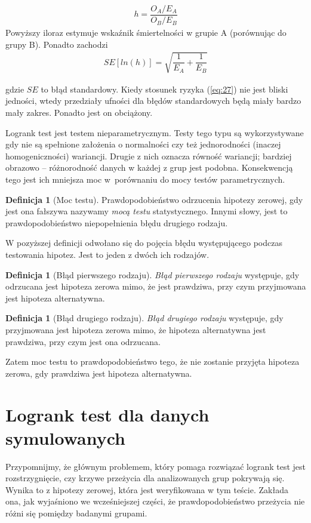 \documentclass[licencjacka]{pwr_wmat_praca_dyplomowa}
\theoremstyle{plain}
\numberwithin{theorem}{chapter}
\theoremstyle{definition}
\numberwithin{theorem}{chapter}
\newtheorem{definition}[theorem]{Definicja}
\begin{document}
\begin{align}
h=\dfrac{O_A/E_A}{O_B/E_B}
\label{eq:27}
\end{align}
Powyższy iloraz estymuje wskaźnik śmiertelności w grupie A (porównując do grupy B). Ponadto zachodzi
\begin{align*}
SE[ln(h)]=\sqrt{\dfrac{1}{E_A}+\dfrac{1}{E_B}}
\end{align*}

\noindent gdzie $SE$ to błąd standardowy. Kiedy stosunek ryzyka (\ref{eq:27}) nie jest bliski jedności, wtedy przedziały ufności dla błędów standardowych będą miały bardzo mały zakres. Ponadto jest on obciążony.

Logrank test jest testem nieparametrycznym. Testy tego typu są wykorzystywane gdy nie są spełnione założenia o normalności czy też jednorodności (inaczej homogeniczności) wariancji. Drugie z nich oznacza równość wariancji; bardziej obrazowo -- różnorodność danych w każdej z grup jest podobna. Konsekwencją tego jest ich mniejsza moc w~porównaniu do mocy testów parametrycznych. 
\begin{definition}[Moc testu]
Prawdopodobieństwo odrzucenia hipotezy zerowej, gdy jest ona fałszywa nazywamy \textit{mocą testu} statystycznego. Innymi słowy, jest to prawdopodobieństwo niepopełnienia błędu drugiego rodzaju. \cite{post}
\end{definition}

W pozyższej definicji odwołano się do pojęcia błędu występującego podczas testowania hipotez. Jest to jeden z dwóch ich rodzajów.

\begin{definition}[Błąd pierwszego rodzaju]
	\textit{Błąd pierwszego rodzaju} występuje, gdy odrzucana jest hipoteza zerowa mimo, że jest prawdziwa, przy czym przyjmowana jest hipoteza alternatywna. \cite{ittpos}
\end{definition}

\begin{definition}[Błąd drugiego rodzaju]
	\textit{Błąd drugiego rodzaju} występuje, gdy przyjmowana jest hipoteza zerowa mimo, że hipoteza alternatywna jest prawdziwa, przy czym jest ona odrzucana. \cite{ittpos}
\end{definition}

Zatem moc testu to prawdopodobieństwo tego, że nie zostanie przyjęta hipoteza zerowa, gdy prawdziwa jest hipoteza alternatywna.


\section{Logrank test dla danych symulowanych}
Przypomnijmy, że głównym problemem, który pomaga rozwiązać logrank test jest rozstrzygnięcie, czy krzywe przeżycia dla analizowanych grup pokrywają się. Wynika to z hipotezy zerowej, która jest weryfikowana w tym teście. Zakłada ona, jak wyjaśniono we wcześniejszej części, że prawdopodobieństwo przeżycia nie różni się pomiędzy badanymi grupami.
\end{document}
